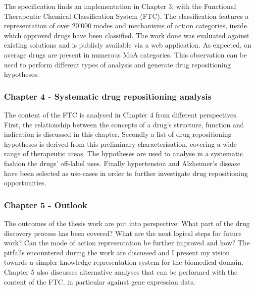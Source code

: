 The specification finds an implementation in Chapter 3, with the Functional Therapeutic Chemical Classification System (FTC). The classification features a representation of over 20’000 modes and mechanisms of action categories, inside which approved drugs have been classified. The work done was evaluated against existing solutions and is publicly available via a web application. As expected, on average drugs are present in numerous MoA categories. This observation can be used to perform different types of analysis and generate drug repositioning hypotheses.

\subsubsection{Chapter 4 - Systematic drug repositioning analysis}

The content of the FTC is analysed in Chapter 4 from different perspectives. First, the relationship between the concepts of a drug’s structure, function and indication is discussed in this chapter. Secondly a list of drug repositioning hypotheses is derived from this preliminary characterisation, covering a wide range of therapeutic areas. The hypotheses are used to analyse in a systematic fashion the drugs’ off-label uses. Finally hypertension and Alzheimer's disease have been selected as use-cases in order to further investigate drug repositioning opportunities.

\subsubsection{Chapter 5 - Outlook}

The outcomes of the thesis work are put into perspective: What part of the drug discovery process has been covered? What are the next logical steps for future work? Can the mode of action representation be further improved and how? The pitfalls encountered during the work are discussed and I present my vision towards a simpler knowledge representation system for the biomedical domain. Chapter 5 also discusses alternative analyses that can be performed with the content of the FTC, in particular against gene expression data.
